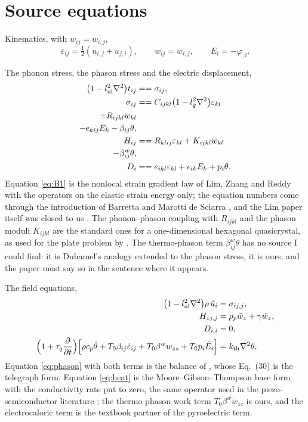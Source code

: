 \documentclass[11pt]{article}
\begin{document}
\section{Source equations}\label{sec:source}

Kinematics, with $w_{ij}=w_{i,j}$,
\begin{equation}
\varepsilon_{ij}=\tfrac12(u_{i,j}+u_{j,i}),\qquad w_{ij}=w_{i,j},\qquad E_i=-\varphi_{,i}.
\label{eq:kin}
\end{equation}

The phonon stress, the phason stress and the electric displacement,
\begin{align}
\bigl(1-l_{\rm nl}^2\nabla^2\bigr)t_{ij}&==\sigma_{ij}, \\
\sigma_{ij}&==C_{ijkl}\bigl(1-l_g^2\nabla^2\bigr)\varepsilon_{kl} \\
\quad +R_{ijkl}w_{kl} \\
-e_{kij}E_k-\beta_{ij}\theta,\label{eq:B1} \\
H_{ij}&==R_{klij}\varepsilon_{kl}+K_{ijkl}w_{kl} \\
\quad -\beta^{w}_{ij}\theta,\label{eq:B2} \\
D_i&==e_{ikl}\varepsilon_{kl}+\epsilon_{ik}E_k+p_i\theta .\label{eq:B3}
\end{align}
Equation \eqref{eq:B1} is the nonlocal strain gradient law of Lim, Zhang and Reddy with the operators on
the elastic strain energy only; the equation numbers come through the introduction of Barretta and Marotti
de Sciarra \cite[Eqs.~(18)--(19)]{Barretta2018}, and the Lim paper itself was closed to us \cite{Lim2015}.
The phonon--phason coupling with $R_{ijkl}$ and the phason moduli $K_{ijkl}$ are the standard ones for a
one-dimensional hexagonal quasicrystal, as used for the plate problem by \cite{Zhang2021}. The
thermo-phason term $\beta^{w}_{ij}\theta$ has no source I could find: it is Duhamel's analogy extended to
the phason stress, it is ours, and the paper must say so in the sentence where it appears.

The field equations,
\begin{align}
\bigl(1-l_{\rm nl}^2\nabla^2\bigr)\rho\,\ddot u_i&=\sigma_{ij,j},\label{eq:mom}\\
H_{zj,j}&=\rho_p\ddot w_z+\gamma\dot w_z,\label{eq:phason}\\
D_{i,i}&=0,\label{eq:gauss}\\
\Bigl(1+\tau_q\frac{\partial}{\partial t}\Bigr)
\Bigl[\rho c_p\dot\theta+T_0\beta_{ij}\dot\varepsilon_{ij}
+T_0\beta^{w}w_{zz}+T_0p_i\dot E_i\Bigr]&=k_{\rm th}\nabla^2\theta .
\label{eq:heat}
\end{align}
Equation \eqref{eq:phason} with both terms is the balance of \cite[Eq.~(26)]{Agiasofitou2014}, whose
Eq.~(30) is the telegraph form. Equation \eqref{eq:heat} is the Moore--Gibson--Thompson base form with the
conductivity rate put to zero, the same operator used in the piezo-semiconductor literature
\cite{Gupta2025}; the thermo-phason work term $T_0\beta^{w}\dot w_{zz}$ is ours, and the electrocaloric term
is the textbook partner of the pyroelectric term.
\end{document}
